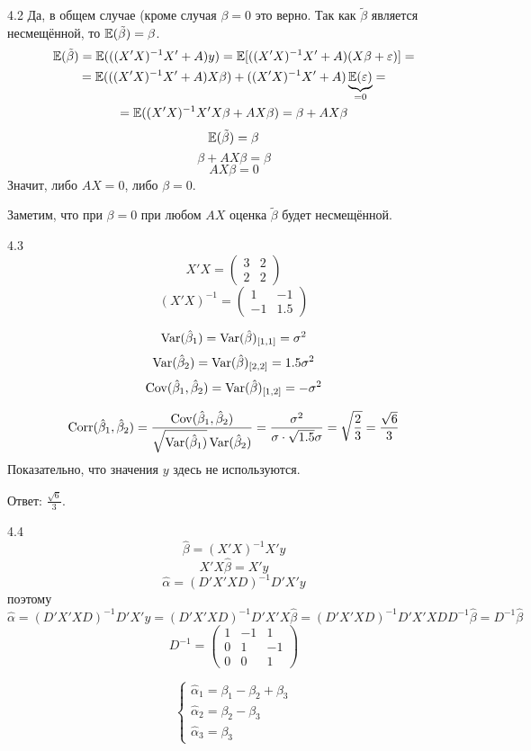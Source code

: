 \protect \hypertarget {soln:4.2}{}
\begin{solution}{{4.2}}
Да, в общем случае (кроме случая $\beta=0$ это верно. Так как $\tilde\beta$ является несмещённой, то $\mathbb{E}(\tilde\beta)=\beta$.
\begin{multline*}
\mathbb{E}(\tilde\beta)=\mathbb{E}(((X'X)^{-1}X'+A)y)=\mathbb{E}[((X'X)^{-1}X'+A)(X\beta+\varepsilon)]=\\=
\mathbb{E}(((X'X)^{-1}X'+A)X\beta)+((X'X)^{-1}X'+A)\underbrace{\mathbb{E}(\varepsilon)}_{=0}=\\
=\mathbb{E}((X'X)^{-1}X'X\beta+AX\beta)=\beta+AX\beta
\end{multline*}
\[\mathbb{E}(\tilde\beta)=\beta\]
\[\beta+AX\beta=\beta\]
\[AX\beta=0\]
Значит, либо $AX=0$, либо $\beta=0$.

Заметим, что при $\beta=0$ при любом $AX$ оценка $\tilde\beta$ будет несмещённой.
\end{solution}
\protect \hypertarget {soln:4.3}{}
\begin{solution}{{4.3}}
\[X'X=\left(\begin{array}{cc}
3 & 2 \\
2 & 2
\end{array}\right) \]
\[(X'X)^{-1}=\left(\begin{array}{cc}
1 & -1 \\
-1 & 1.5
\end{array}\right) \]

\[\operatorname{Var}(\hat\beta_1)=\operatorname{Var}(\hat\beta)_{[1,1]}=\sigma^2\]
\[\operatorname{Var}(\hat\beta_2)=\operatorname{Var}(\hat\beta)_{[2,2]}=1.5\sigma^2\]
\[\operatorname{Cov}(\hat\beta_1,\hat\beta_2)=\operatorname{Var}(\hat\beta)_{[1,2]}=-\sigma^2\]

\[\operatorname{Corr}(\hat\beta_1,\hat\beta_2)=\frac{\operatorname{Cov}(\hat\beta_1,\hat\beta_2)}{\sqrt{\operatorname{Var}(\hat\beta_1)}\operatorname{Var}(\hat\beta_2)}=\\
\\\frac{\sigma^2}{\sigma\cdot\sqrt{1.5}\sigma}=\sqrt{\frac{2}{3}}=\frac{\sqrt6}{3}\]
Показательно, что значения $y$ здесь не используются.

Ответ: $\frac{\sqrt6}{3}$.
\end{solution}
\protect \hypertarget {soln:4.4}{}
\begin{solution}{{4.4}}
\[\hat\beta=(X'X)^{-1}X'y\]
\[X'X\hat\beta=X'y\]
\[\hat\alpha=(D'X'XD)^{-1}D'X'y\]
поэтому
\[\hat\alpha=(D'X'XD)^{-1}D'X'y=(D'X'XD)^{-1}D'X'X\hat\beta=(D'X'XD)^{-1}D'X'XDD^{-1}\hat\beta=D^{-1}\hat\beta\]
\[D^{-1}=\left(\begin{array}{ccc}
1 & -1 & 1\\
0 & 1 & -1\\
0 & 0 & 1
\end{array}\right)\]

\[\begin{cases}
\hat\alpha_1=\beta_1-\beta_2+\beta_3\\
\hat\alpha_2=\beta_2-\beta_3\\
\hat\alpha_3=\beta_3
\end{cases}\]
\end{solution}
